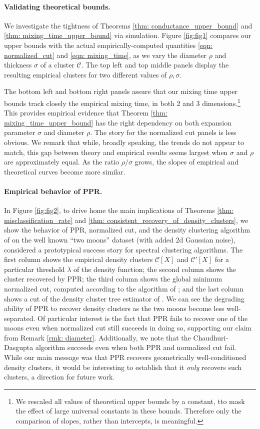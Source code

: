 \documentclass[11pt,twoside]{article}
\newcommand{\1}{\mathbf{1}}
\newcommand{\Xbf}{X}             %
\newcommand{\Cset}{\mathcal{C}}
\begin{document}
\paragraph{Validating theoretical bounds.}  We investigate the tightness of
Theorems \ref{thm: conductance_upper_bound} and \ref{thm:
  mixing_time_upper_bound} via simulation. Figure \ref{fig:fig1} compares our
upper bounds with the actual empirically-computed quantities \eqref{eqn:
  normalized_cut} and \eqref{eqn: mixing_time}, as we vary the diameter $\rho$
and thickness $\sigma$ of a cluster $\Cset$. The top left and top middle panels
display the resulting empirical clusters for two different values of
$\rho,\sigma$. 

The bottom left and bottom right panels assure that our mixing  
time upper bounds track closely the empirical mixing time, in both 2 and 3 
dimensions.\footnote{We rescaled all values of theoretical upper
  bounds by a constant, tto mask the effect of large universal constants
  in these bounds. Therefore only the comparison of slopes, rather than
  intercepts, is meaningful.} This provides empirical evidence that Theorem
\ref{thm: mixing_time_upper_bound} has the right dependency on both expansion
parameter $\sigma$ and diameter $\rho$. The story for the normalized cut panels
is less obvious. We remark that while, broadly speaking, the trends do not
appear to match, this gap between theory and empirical results seems largest
when $\sigma $ and $\rho$ are approximately equal. As the ratio $\rho/\sigma$
grows, the slopes of empirical and theoretical curves become more similar.

\paragraph{Empirical behavior of PPR.} In Figure \ref{fig:fig2}, to drive home
the main implications of Theorems \ref{thm: misclassification_rate} and
\ref{thm: consistent_recovery_of_density_clusters}, we show the
behavior of PPR, normalized cut, and the density clustering algorithm of
\citet{chaudhuri2010} on the well known ``two moons'' dataset (with added 2d 
Gaussian noise), considered a prototypical success story for spectral clustering
algorithms. The first column shows the empirical density clusters $\Cset[\Xbf]$
and $\Cset'[\Xbf]$ for a particular threshold $\lambda$ of the density function; the 
second column shows the cluster recovered by PPR; the third column shows the
global minimum normalized cut, computed according to the algorithm of
\citet{szlam2010}; and the last column shows a cut of the density cluster tree
estimator of \citet{chaudhuri2010}.  We can see the degrading ability of PPR to
recover density clusters as the two moons become less well-separated. Of 
particular interest is the fact that PPR fails to recover one of the moons even
when normalized cut still succeeds in doing so, supporting our claim from Remark
\ref{rmk: diameter}. Additionally, we note that the Chaudhuri-Dasgupta algorithm 
succeeds even when both PPR and normalized cut fail.  While our main message was
that PPR recovers geometrically well-conditioned density clusters, it would be  
interesting to establish that it \emph{only} recovers such clusters, a direction
for future work.   
\end{document}

